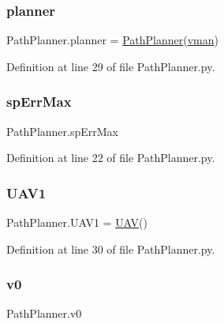 \subsubsection{\texorpdfstring{planner}{planner}}
{\footnotesize\ttfamily Path\+Planner.\+planner = \mbox{\hyperlink{classpath_plan_1_1_path_planner}{Path\+Planner}}(\mbox{\hyperlink{namespace_path_planner_aeb46822ede819d38fe65ab788c4db880}{vman}})}



Definition at line 29 of file Path\+Planner.\+py.

\mbox{\label{namespace_path_planner_ac38e0b1ad38a86577398aa6a7f2dae86}} 
\subsubsection{\texorpdfstring{sp\+Err\+Max}{spErrMax}}
{\footnotesize\ttfamily Path\+Planner.\+sp\+Err\+Max}



Definition at line 22 of file Path\+Planner.\+py.

\mbox{\label{namespace_path_planner_a2aedcc016952497246f4666ce4e03505}} 
\subsubsection{\texorpdfstring{U\+A\+V1}{UAV1}}
{\footnotesize\ttfamily Path\+Planner.\+U\+A\+V1 = \mbox{\hyperlink{classpath_plan_1_1_u_a_v}{U\+AV}}()}



Definition at line 30 of file Path\+Planner.\+py.

\mbox{\label{namespace_path_planner_a40f708313656ecef4a5166fc9bdab1a2}} 
\subsubsection{\texorpdfstring{v0}{v0}}
{\footnotesize\ttfamily Path\+Planner.\+v0}



